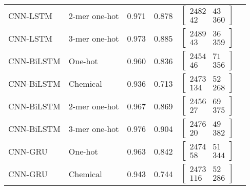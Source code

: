 \begin{longtable}{llllll}
    CNN-LSTM & 2-mer one-hot & 0.971 & 0.878 &
    $\begin{bmatrix}
        2482 & 43\\ 
        42 & 360
    \end{bmatrix}$
    \\

    CNN-LSTM & 3-mer one-hot & 0.973 & 0.885 &
    $\begin{bmatrix}
        2489 & 36\\ 
        43 & 359
    \end{bmatrix}$
    \\\midrule


    CNN-BiLSTM & One-hot & 0.960 & 0.836 &
    $\begin{bmatrix}
        2454 & 71\\ 
        46 & 356
    \end{bmatrix}$
    \\

    CNN-BiLSTM & Chemical & 0.936 & 0.713 &
    $\begin{bmatrix}
        2473 & 52\\
        134 & 268
    \end{bmatrix}$
    \\

    CNN-BiLSTM & 2-mer one-hot & 0.967 & 0.869 &
    $\begin{bmatrix}
        2456 & 69\\ 
        27 & 375
    \end{bmatrix}$
    \\

    CNN-BiLSTM & 3-mer one-hot & 0.976 & 0.904 &
    $\begin{bmatrix}
        2476 & 49\\ 
        20 & 382
    \end{bmatrix}$
    \\\midrule


    CNN-GRU & One-hot & 0.963 & 0.842 &
    $\begin{bmatrix}
        2474 & 51\\ 
        58 & 344
    \end{bmatrix}$
    \\

    CNN-GRU & Chemical & 0.943 & 0.744 &
    $\begin{bmatrix}
        2473 & 52\\ 
        116 & 286
    \end{bmatrix}$
    \\


\end{longtable}
